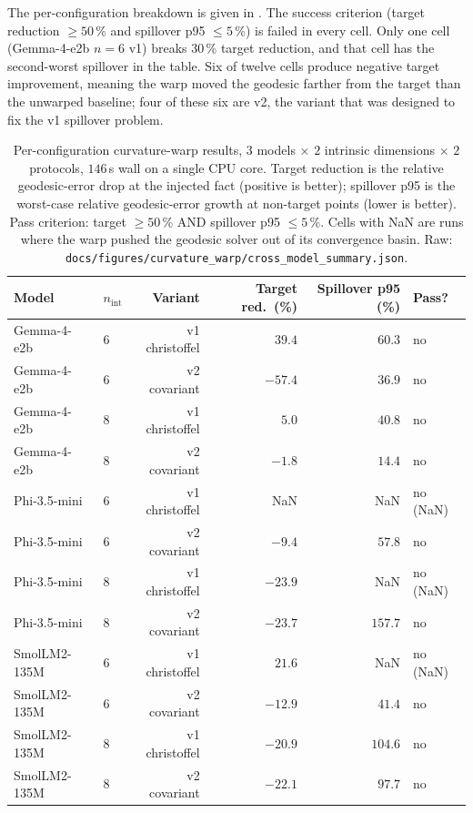 \documentclass[11pt]{article}
\begin{document}
The per-configuration breakdown is given in .
The success criterion (target reduction $\geq 50$\,\% and
spillover p95 $\leq 5$\,\%) is failed in every cell. Only one cell
(Gemma-4-e2b $n{=}6$ v1) breaks $30$\,\% target reduction, and that
cell has the second-worst spillover in the table. Six of twelve
cells produce negative target improvement, meaning the warp
moved the geodesic farther from the target than the unwarped
baseline; four of these six are v2, the variant that was designed to
fix the v1 spillover problem.

\begin{table}[h]\centering\footnotesize
\caption{Per-configuration curvature-warp results, $3$ models $\times$
$2$ intrinsic dimensions $\times$ $2$ protocols, $146$\,s wall on a
single CPU core. Target reduction is the relative geodesic-error drop
at the injected fact (positive is better); spillover p95 is the
worst-case relative geodesic-error growth at non-target points
(lower is better). Pass criterion: target $\geq 50$\,\% AND spillover
p95 $\leq 5$\,\%. Cells with NaN are runs where the warp pushed the
geodesic solver out of its convergence basin. Raw:
\texttt{docs/figures/curvature\_warp/cross\_model\_summary.json}.}
\label{tab:warp-x12}
\begin{tabular}{@{}llrrrl@{}}
\toprule
Model & $n_\text{int}$ & Variant & Target red.\ (\%) & Spillover p95 (\%) & Pass?\\
\midrule
Gemma-4-e2b   & 6 & v1 christoffel & $39.4$  & $60.3$  & no \\
Gemma-4-e2b   & 6 & v2 covariant   & $-57.4$ & $36.9$  & no \\
Gemma-4-e2b   & 8 & v1 christoffel & $5.0$   & $40.8$  & no \\
Gemma-4-e2b   & 8 & v2 covariant   & $-1.8$  & $14.4$  & no \\
Phi-3.5-mini  & 6 & v1 christoffel & NaN     & NaN     & no (NaN) \\
Phi-3.5-mini  & 6 & v2 covariant   & $-9.4$  & $57.8$  & no \\
Phi-3.5-mini  & 8 & v1 christoffel & $-23.9$ & NaN     & no (NaN) \\
Phi-3.5-mini  & 8 & v2 covariant   & $-23.7$ & $157.7$ & no \\
SmolLM2-135M  & 6 & v1 christoffel & $21.6$  & NaN     & no (NaN) \\
SmolLM2-135M  & 6 & v2 covariant   & $-12.9$ & $41.4$  & no \\
SmolLM2-135M  & 8 & v1 christoffel & $-20.9$ & $104.6$ & no \\
SmolLM2-135M  & 8 & v2 covariant   & $-22.1$ & $97.7$  & no \\
\bottomrule
\end{tabular}
\end{table}
\end{document}
